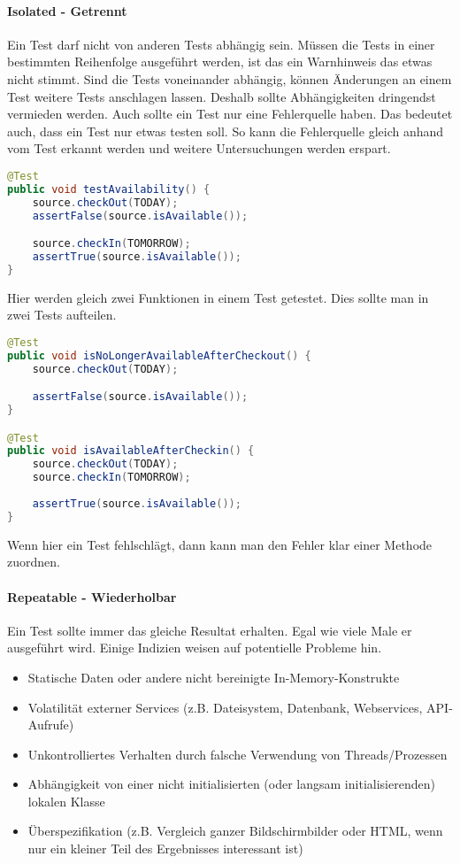 \paragraph{Isolated - Getrennt}
Ein Test darf nicht von anderen Tests abhängig sein. Müssen die Tests in einer bestimmten Reihenfolge ausgeführt werden, ist das ein Warnhinweis das etwas nicht stimmt. Sind die Tests voneinander abhängig, können Änderungen an einem Test weitere Tests anschlagen lassen. Deshalb sollte Abhängigkeiten dringendst vermieden werden. Auch sollte ein Test nur eine Fehlerquelle haben. Das bedeutet auch, dass ein Test nur etwas testen soll. So kann die Fehlerquelle gleich anhand vom Test erkannt werden und weitere Untersuchungen werden erspart.
\begin{lstlisting}[language=Java, caption={Schlechtes Beispiel}]
@Test
public void testAvailability() {
	source.checkOut(TODAY);
	assertFalse(source.isAvailable());

	source.checkIn(TOMORROW);
	assertTrue(source.isAvailable());
}
\end{lstlisting}
Hier werden gleich zwei Funktionen in einem Test getestet. Dies sollte man in zwei Tests aufteilen.
\begin{lstlisting}[language=Java, caption={Gutes Beispiel}]
@Test
public void isNoLongerAvailableAfterCheckout() {
	source.checkOut(TODAY);

	assertFalse(source.isAvailable());
}

@Test
public void isAvailableAfterCheckin() {
	source.checkOut(TODAY);
	source.checkIn(TOMORROW);
 	
	assertTrue(source.isAvailable());
}
\end{lstlisting}
Wenn hier ein Test fehlschlägt, dann kann man den Fehler klar einer Methode zuordnen.
\paragraph{Repeatable - Wiederholbar}
Ein Test sollte immer das gleiche Resultat erhalten. Egal wie viele Male er ausgeführt wird. Einige Indizien weisen auf potentielle Probleme hin.
\begin{itemize}
\item Statische Daten oder andere nicht bereinigte In-Memory-Konstrukte
\item Volatilität externer Services (z.B. Dateisystem, Datenbank, Webservices, API-Aufrufe)
\item Unkontrolliertes Verhalten durch falsche Verwendung von Threads/Prozessen
\item Abhängigkeit von einer nicht initialisierten (oder langsam initialisierenden) lokalen Klasse
\item Überspezifikation (z.B. Vergleich ganzer Bildschirmbilder oder HTML, wenn nur ein kleiner Teil des Ergebnisses interessant ist)
\end{itemize}
